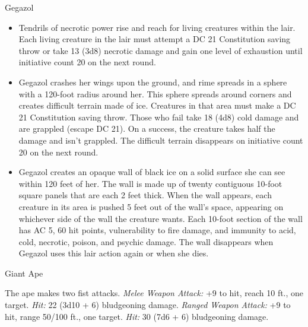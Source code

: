 \documentclass[10pt,a4paper,twoside,twocolumn,openany,bg=print,nodeprecatedcode]{dndbook}
\begin{document}
\begin{DndMonster}[float*=t]{Gegazol}
\begin{itemize}
\item Tendrils of necrotic power rise and reach for living creatures within the lair. Each living creature in the lair must attempt a DC 21 Constitution saving throw or take 13 (3d8) necrotic damage and gain one level of exhaustion until initiative count 20 on the next round.
\item Gegazol crashes her wings upon the ground, and rime spreads in a sphere with a 120-foot radius around her. This sphere spreads around corners and creates difficult terrain made of ice. Creatures in that area must make a DC 21 Constitution saving throw. Those who fail take 18 (4d8) cold damage and are grappled (escape DC 21). On a success, the creature takes half the damage and isn't grappled. The difficult terrain disappears on initiative count 20 on the next round.
\item Gegazol creates an opaque wall of black ice on a solid surface she can see within 120 feet of her. The wall is made up of twenty contiguous 10-foot square panels that are each 2 feet thick. When the wall appears, each creature in its area is pushed 5 feet out of the wall's space, appearing on whichever side of the wall the creature wants. Each 10-foot section of the wall has AC 5, 60 hit points, vulnerability to fire damage, and immunity to acid, cold, necrotic, poison, and psychic damage. The wall disappears when Gegazol uses this lair action again or when she dies.
\end{itemize}

\end{DndMonster}



\begin{DndMonster}[float*=t]{Giant Ape}
\DndMonsterBasics[
armor-class = {12},
hit-points = {\DndDice{15d12 + 60}},
speed = {40 ft., 40 ft. (key)}
]
\DndMonsterAbilityScores[
 str = 23,
 dex = 14,
 con = 18,
 int = 7,
 wis = 12,
 cha = 7
]
\DndMonsterDetails[
skills = {Athletics +9, Perception +4},
challenge = 7,
]
\par
{}
The ape makes two fist attacks.
\textsl{Melee Weapon Attack:} +9 to hit, reach 10 ft., one target. \textsl{Hit:} 22 (3d10 + 6) bludgeoning damage.
\textsl{Ranged Weapon Attack:} +9 to hit, range 50/100 ft., one target. \textsl{Hit:} 30 (7d6 + 6) bludgeoning damage.
\end{DndMonster}
\end{document}
